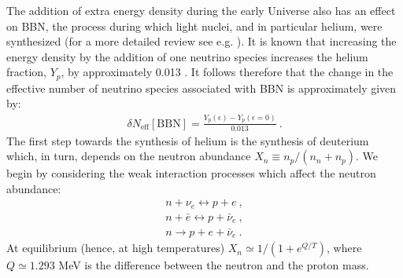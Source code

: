 \documentclass[12pt]{article}
\begin{document}
The addition of extra energy density during the early Universe also has
an effect on BBN, the process during which light nuclei, and in
particular helium, were synthesized (for a more detailed review see e.g.
\cite{weinberg}). It is known that increasing the energy density by the
addition of one neutrino species increases the helium fraction, $Y _p$,
by approximately 0.013 \cite{bernstein}. It follows therefore that the
change in the effective number of neutrino species associated with BBN
is approximately given by:
%
\begin{eqnarray}
\delta N _{\text{eff}}[\text{BBN}] = \frac{Y _p (\epsilon) - Y _p
(\epsilon = 0)}{0.013} \ .
\label{Neffbbn}
\end{eqnarray}
%
The first step towards the synthesis of helium is the synthesis of
deuterium which, in turn, depends on the neutron abundance $X _n \equiv
n _p/(n _n + n _p)$. We begin by considering the weak interaction
processes which affect the neutron abundance:
%
\begin{eqnarray}
n + \nu _e \leftrightarrow p + e \ , \nonumber \\
n + \bar e \leftrightarrow p + \bar \nu _e \ , \nonumber \\
n \rightarrow p + e + \bar \nu _e \ .
\end{eqnarray}
%
At equilibrium (hence, at high temperatures) $X _n \simeq 1/(1 +
e^{Q/T})$, where $Q \simeq 1.293$ MeV is the difference between the
neutron and the proton mass.
\end{document}
